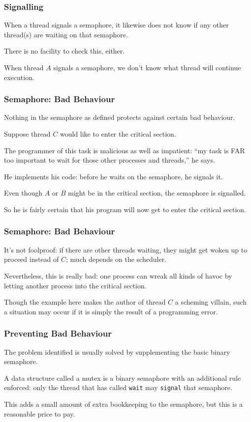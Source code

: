 \begin{frame}
\frametitle{Signalling}

When a thread signals a semaphore, it likewise does not know if any other thread(s) are waiting on that semaphore. 

There is no facility to check this, either. 

When thread $A$ signals a semaphore, we don't know what thread will continue execution.


\end{frame}

\begin{frame}
\frametitle{Semaphore: Bad Behaviour}

Nothing in the semaphore as defined protects against certain bad behaviour.

Suppose thread $C$ would like to enter the critical section. 

The programmer of this task is malicious as well as impatient: ``my task is FAR too important to wait for those other processes and threads,'' he says. 

He implements his code: before he waits on the semaphore, he signals it. 

Even though $A$ or $B$ might be in the critical section, the semaphore is signalled.

So he is fairly certain that his program will now get to enter the critical section. 
\end{frame}

\begin{frame}
\frametitle{Semaphore: Bad Behaviour}

It's not foolproof: if there are other threads waiting, they might get woken up to proceed instead of $C$; much depends on the scheduler. 

Nevertheless, this is really bad: one process can wreak all kinds of havoc by letting another process into the critical section. 

Though the example here makes the author of thread $C$ a scheming villain, such a situation may occur if it is simply the result of a programming error.

\end{frame}

\begin{frame}
\frametitle{Preventing Bad Behaviour}

The problem identified is usually solved by supplementing the basic binary semaphore. 

A data structure called a \alert{mutex} is a binary semaphore with an additional rule enforced: only the thread that has called \texttt{wait} may \texttt{signal} that semaphore. 

This adds a small amount of extra bookkeeping to the semaphore, but this is a reasonable price to pay.

\end{frame}

